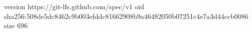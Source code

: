 version https://git-lfs.github.com/spec/v1
oid sha256:508de5dc8462c9b003efddc81662908b9a46482050b07251c4e7a3d44ccb0086
size 696
